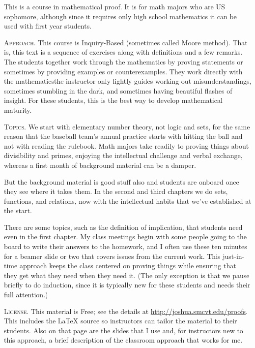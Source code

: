 \documentclass{ibl}
\begin{document}
This is a course in mathematical proof. 
It is for math majors who are US sophomore, although since
it requires only high school mathematics
it can be used with first year students.



\medskip
\noindent\textsc{Approach.}
This course is Inquiry-Based (sometimes called Moore method).
That is, this text is a sequence of exercises
along with definitions and a few 
remarks.
The students together work through the mathematics by
proving statements or sometimes by providing examples or counterexamples.
They work directly with the mathematics\Dash the instructor only 
lightly guides\Dash
working out misunderstandings, 
sometimes stumbling in the dark, and sometimes
having beautiful flashes of insight.
For these students, 
this is the best way to develop mathematical maturity.


\medskip
\noindent\textsc{Topics.}
We start with elementary number theory, not logic and sets, 
for the same reason
that the baseball team's annual practice starts with hitting the ball and 
not with reading the rulebook.
Math majors take readily to proving things about
divisibility and primes, enjoying the 
intellectual challenge and verbal exchange, 
whereas a first month of background material can be a damper.

But the background material is good stuff also and 
students are onboard once they see where it takes them.
In the second and third chapters we do
sets, functions, and relations, now with the
intellectual habits that we've established at the start.

There are some topics, such as the definition of implication, 
that students need even in the
first chapter.
My class meetings begin with some people going to the 
board to write their answers to the homework, and 
I often use these ten minutes for a beamer slide or two that covers issues from
the current work.
This just-in-time approach keeps the class centered 
on proving things while ensuring that they get what
they need when they need it.
(The only exception is that we pause briefly to do induction,
since it is typically new for these students and needs 
their full attention.)



\medskip
\noindent\textsc{License.}
This material is Free; see the details  
at \url{http://joshua.smcvt.edu/proofs}.
This includes the \LaTeX{} source so instructors can tailor the
material to their students.  
Also on that page are the slides that I use
and, for instructors new to this approach, 
a brief description of the classroom approach that works for me.
\end{document}

